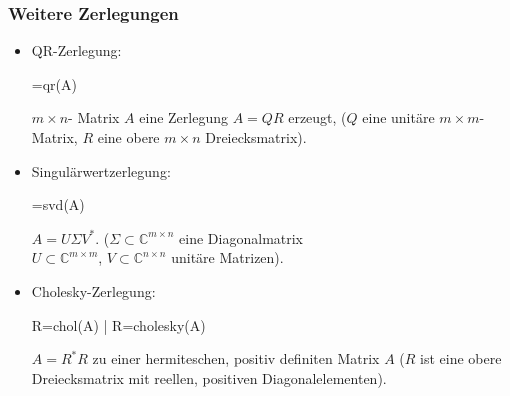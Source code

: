 \documentclass[hyperref={xetex}]{beamer}
\begin{document}
\begin{frame}[fragile]\frametitle{Weitere Zerlegungen}
\begin{itemize}
\item \alert{QR-Zerlegung}: 
  \begin{matlabin}
[Q,R]=qr(A)
  \end{matlabin}
  $m \times n$- Matrix $A$ eine Zerlegung { $A=QR$} erzeugt,
  ($Q$ eine unitäre $m \times m$-Matrix, $R$ eine obere $m \times n$ Dreiecksmatrix).
\item \alert{Singulärwertzerlegung}: 
  \begin{matlabin}
[U,S,V]=svd(A)
  \end{matlabin}
  { $A=U \Sigma V^*$}. 
  ($\Sigma \subset \mathbb{C}^{m \times n}$ eine Diagonalmatrix \\
  $U \subset \mathbb{C}^{m \times m}$, $V \subset  \mathbb{C}^{n \times n}$ unitäre Matrizen). 

\item \alert{Cholesky-Zerlegung}: 
  \begin{matlabin}
R=chol(A) | R=cholesky(A)
  \end{matlabin}
  { $A=R^*R$} zu einer hermiteschen, positiv definiten Matrix
  $A$ ($R$ ist eine obere Dreiecksmatrix mit reellen, positiven
  Diagonalelementen). 
\end{itemize}


\end{frame}
\end{document}
